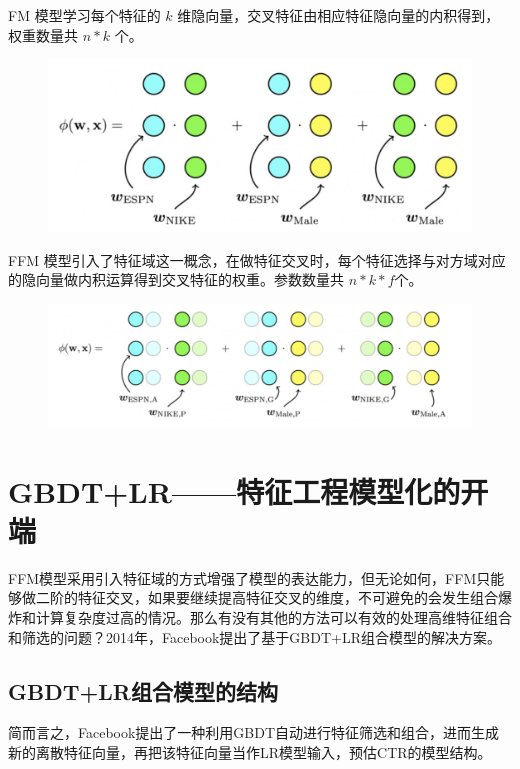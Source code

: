 \documentclass[12pt]{article}
\begin{document}
FM 模型学习每个特征的 $k$ 维隐向量，交叉特征由相应特征隐向量的内积得到，权重数量共 $n*k$ 个。
\begin{figure}[H]
    \centering
    \includegraphics[width=1\textwidth]{fig/CTR_Comparison_FM.png}
\end{figure}

FFM 模型引入了特征域这一概念，在做特征交叉时，每个特征选择与对方域对应的隐向量做内积运算得到交叉特征的权重。参数数量共 $n*k*f$个。
\begin{figure}[H]
    \centering
    \includegraphics[width=1\textwidth]{fig/CTR_Comparison_FFM.png}
\end{figure}

\section{GBDT+LR——特征工程模型化的开端}
FFM模型采用引入特征域的方式增强了模型的表达能力，但无论如何，FFM只能够做二阶的特征交叉，如果要继续提高特征交叉的维度，不可避免的会发生组合爆炸和计算复杂度过高的情况。那么有没有其他的方法可以有效的处理高维特征组合和筛选的问题？2014年，Facebook提出了基于GBDT+LR组合模型的解决方案。

\subsection{GBDT+LR组合模型的结构}
简而言之，Facebook提出了一种利用GBDT自动进行特征筛选和组合，进而生成新的离散特征向量，再把该特征向量当作LR模型输入，预估CTR的模型结构。
\end{document}
